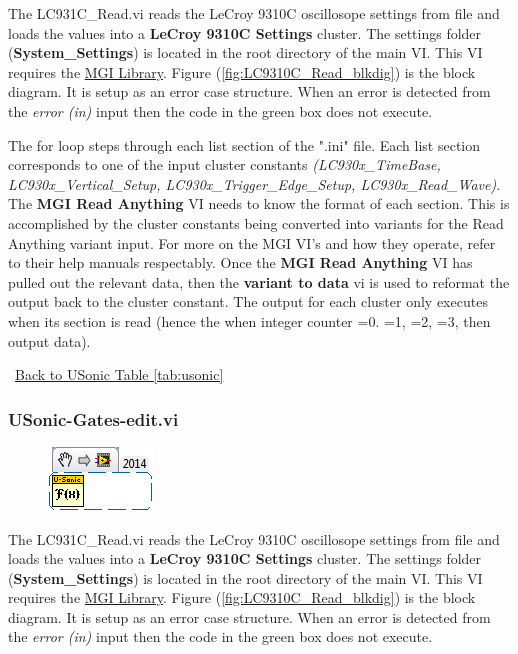 \documentclass[11pt,a4paper,oldfontcommands]{memoir}
\begin{document}
The LC931C\_Read.vi reads the LeCroy 9310C oscillosope settings from file and loads the values into a \textbf{LeCroy 9310C Settings} cluster. The settings folder (\textbf{System\_Settings}) is located in the root directory of the main VI. This VI requires the \href{http://sine.ni.com/nips/cds/view/p/lang/en/nid/209753}{MGI Library}. Figure (\ref{fig:LC9310C_Read_blkdig}) is the block diagram.  It is setup as an error case structure. When an error is detected from the \textit{error (in)} input then the code in the green box does not execute.

The for loop steps through each list section of the ".ini" file. Each list section corresponds to one of the input cluster constants \textit{(LC930x\_TimeBase, LC930x\_Vertical\_Setup, LC930x\_Trigger\_Edge\_Setup, LC930x\_Read\_Wave)}. The \textbf{MGI Read Anything} VI needs to know the format of each section. This is accomplished by the cluster constants being converted into variants for the Read Anything variant input.  For more on the MGI VI's and how they operate, refer to their help manuals respectably. Once the \textbf{MGI Read Anything} VI has pulled out the relevant data, then the \textbf{variant to data} vi is used to reformat the output back to the cluster constant. The output for each cluster only executes when its section is read (hence the when integer counter =0. =1, =2, =3, then output data).

\noindent\hrulefill\, \hyperref[tab:usonic]{Back to USonic Table \ref{tab:usonic}}

\subsubsection{USonic-Gates-edit.vi} \label{USonic-Gates}
\noindent\hrulefill

\begin{figure}[h]
	\includegraphics[scale=0.625]{USonic-FFT_main_01}
	\label{fig:USonic-Gates-edit_main_01}
\end{figure}

The LC931C\_Read.vi reads the LeCroy 9310C oscillosope settings from file and loads the values into a \textbf{LeCroy 9310C Settings} cluster. The settings folder (\textbf{System\_Settings}) is located in the root directory of the main VI. This VI requires the \href{http://sine.ni.com/nips/cds/view/p/lang/en/nid/209753}{MGI Library}. Figure (\ref{fig:LC9310C_Read_blkdig}) is the block diagram.  It is setup as an error case structure. When an error is detected from the \textit{error (in)} input then the code in the green box does not execute.
\end{document}
